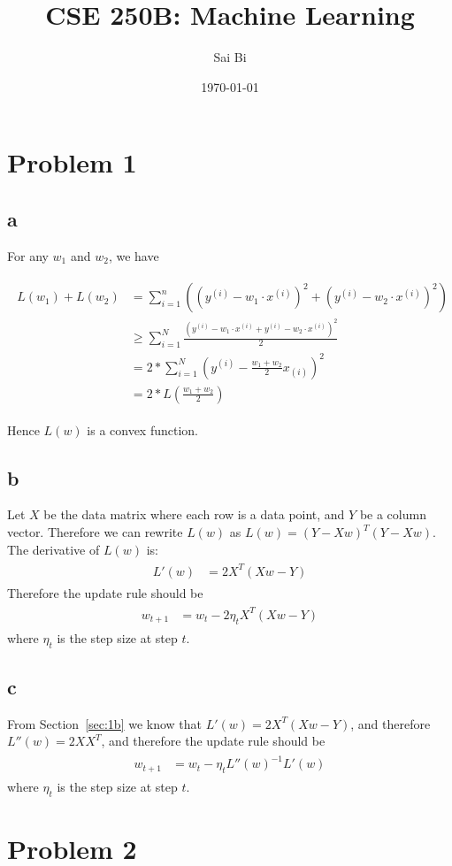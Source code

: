 \documentclass[a4paper,11pt]{article}
\theoremstyle{mytheor}
\newcommand{\myequ}[1]{\begin{align}\begin{split} #1 \end{split}\end{align}}
\begin{document}
\title{CSE 250B: Machine Learning}

\author{Sai Bi}

\date{\today}

\maketitle

\section*{Problem 1}
\subsection*{a}
For any $w_1$ and $w_2$, we have

\begin{align}
	\begin{split}
		L(w_1) + L(w_2) &= \sum_{i=1}^{n} ((y^{(i)} - w_1 \cdot x^{(i)})^2 + (y^{(i)} - w_2 \cdot x^{(i)})^2) \\
						& \geq  \sum_{i=1}^{N}\frac{(y^{(i)} -  w_1 \cdot x^{(i)} + y^{(i)} -  w_2 \cdot x^{(i)} )^2 }{2} \\
					& = 2 * \sum_{i=1}^{N} (y^{(i)} - \frac{w_1 + w_2}{2} x_{(i)})^2 \\
					& = 2 * L(\frac{w_1+w_2}{2})
	\end{split}
\end{align}

Hence $L(w)$ is a convex function.

\subsection*{b}\label{sec:1b}
Let $X$  be the data matrix where each row is a data point, and $Y$ be a column vector. Therefore we can rewrite $L(w)$
as $L(w) = (Y - Xw)^T (Y - Xw)$. The derivative of $L(w)$ is:
\myequ{
	L'(w) &= 2X^T(Xw-Y) 
}
Therefore the update rule should be 
\myequ{
	w_{t+1} &= w_t - 2\eta_{t} X^T (Xw-Y) 
}
where $\eta_{t}$ is the step size at step $t$.
\subsection*{c}
From Section~\ref{sec:1b} we know that $L'(w) = 2X^T(Xw-Y) $, and therefore $L''(w) = 2XX^T$, and therefore the update
rule should be
\myequ{
	w_{t+1} &= w_t - \eta_{t} L''(w)^{-1} L'(w)
}
where $\eta_{t}$ is the step size at step $t$.


\section*{Problem 2}
\end{document}
